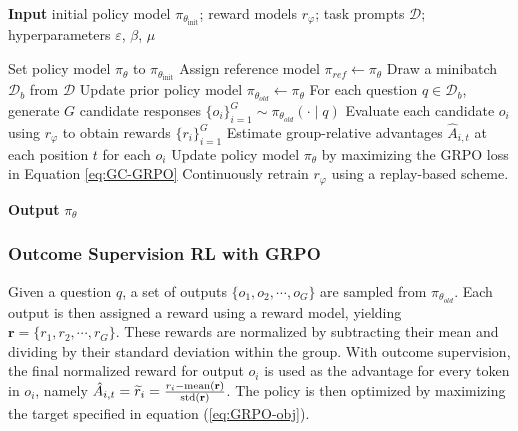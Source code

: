 \begin{algorithm}[t]
  \small
  \caption{Iterative Group Relative Policy Optimization}
  \textbf{Input} initial policy model $\pi_{\theta_{\text{init}}}$; reward models $r_\varphi$; task prompts $\mathcal{D}$; 
  hyperparameters $\varepsilon$, $\beta$, $\mu$
  \begin{algorithmic}[1]
    \State Set policy model $\pi_\theta$ to $\pi_{\theta_{\text{init}}}$
      \State Assign reference model $\pi_{ref} \leftarrow \pi_{\theta}$
      \State Draw a minibatch $\mathcal{D}_b$ from $\mathcal{D}$
      \State Update prior policy model $\pi_{\theta_{old}} \leftarrow \pi_{\theta}$ 
      \State For each question $q \in \mathcal{D}_b$, generate $G$ candidate responses $\{o_i\}_{i=1}^G \sim \pi_{\theta_{old}} (\cdot \mid q)$
      \State Evaluate each candidate $o_i$ using $r_{\varphi}$ to obtain rewards $\{r_i\}_{i=1}^{G}$
      \State Estimate group-relative advantages $\hat{A}_{i,t}$ at each position $t$ for each $o_i$
        \State Update policy model $\pi_{\theta}$ by maximizing the GRPO loss in Equation \ref{eq:GC-GRPO}
      \EndFor
    \EndFor \State Continuously retrain $r_\varphi$ using a replay-based scheme.
    \EndFor 
  \end{algorithmic}
  \textbf{Output} $\pi_\theta$
  \label{alg:iter-grpo}
\end{algorithm}

\subsubsection{Outcome Supervision RL with GRPO} Given a question $q$, a set of outputs $\{o_1, o_2, \cdots, o_G\}$ are sampled from $\pi_{\theta_{old}}$. Each output is then assigned a reward using a reward model, yielding $\mathbf{r}=\{r_1, r_2, \cdots, r_G\}$. These rewards are normalized by subtracting their mean and dividing by their standard deviation within the group. With outcome supervision, the final normalized reward for output $o_i$ is used as the advantage for every token in $o_i$, namely $\hat{A}_{i, t} = \widetilde{r}_i = \frac{r_i- {\rm mean}(\mathbf{r})}{{\rm std}(\mathbf{r})}$. The policy is then optimized by maximizing the target specified in equation (\ref{eq:GRPO-obj}).

